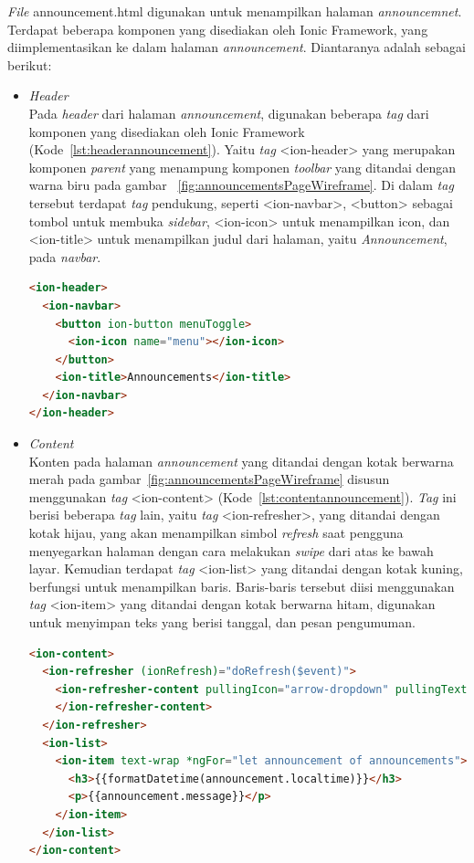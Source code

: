 \begin{itemize}
	\textit{File} announcement.html digunakan untuk menampilkan halaman \textit{announcemnet}. Terdapat beberapa komponen yang disediakan oleh Ionic Framework, yang diimplementasikan ke dalam halaman \textit{announcement}. Diantaranya adalah sebagai berikut:	
	
	\begin{itemize}
		\item \textit{Header} \\
		Pada \textit{header} dari halaman \textit{announcement}, digunakan beberapa \textit{tag} dari komponen yang disediakan oleh Ionic Framework (Kode~\ref{lst:headerannouncement}). Yaitu \textit{tag} <ion-header> yang merupakan komponen \textit{parent} yang menampung komponen \textit{toolbar} yang ditandai dengan warna biru pada gambar ~\ref{fig:announcementsPageWireframe}. Di dalam \textit{tag} tersebut terdapat \textit{tag} pendukung, seperti <ion-navbar>, <button> sebagai tombol untuk membuka \textit{sidebar}, <ion-icon> untuk menampilkan icon, dan <ion-title> untuk menampilkan judul dari halaman, yaitu \textit{Announcement}, pada \textit{navbar}.
		\newpage
\begin{lstlisting}[language=html, label={lst:headerannouncement}, caption=\textit{Header} pada halaman \textit{Annoncement}]
<ion-header>
  <ion-navbar>
    <button ion-button menuToggle>
      <ion-icon name="menu"></ion-icon>
    </button>
    <ion-title>Announcements</ion-title>
  </ion-navbar>
</ion-header>
\end{lstlisting} 

		\item \textit{Content} \\
		Konten pada halaman \textit{announcement} yang ditandai dengan kotak berwarna merah pada gambar~\ref{fig:announcementsPageWireframe} disusun menggunakan \textit{tag} <ion-content> (Kode~\ref{lst:contentannouncement}). \textit{Tag} ini berisi beberapa \textit{tag} lain, yaitu \textit{tag} <ion-refresher>, yang ditandai dengan kotak hijau, yang akan menampilkan simbol \textit{refresh} saat pengguna menyegarkan halaman dengan cara melakukan \textit{swipe} dari atas ke bawah layar. Kemudian terdapat \textit{tag} <ion-list> yang ditandai dengan kotak kuning, berfungsi untuk menampilkan baris. Baris-baris tersebut diisi menggunakan \textit{tag} <ion-item> yang ditandai dengan kotak berwarna hitam, digunakan untuk menyimpan teks yang berisi tanggal, dan pesan pengumuman.
		
\begin{lstlisting}[language=html, label={lst:contentannouncement}, caption=\textit{Content} pada halaman \textit{annoncement}]
<ion-content>
  <ion-refresher (ionRefresh)="doRefresh($event)">
    <ion-refresher-content pullingIcon="arrow-dropdown" pullingText="Pull to refresh" refreshingSpinner="circles" refreshingText="Refreshing...">
    </ion-refresher-content>
  </ion-refresher>
  <ion-list>
    <ion-item text-wrap *ngFor="let announcement of announcements">
      <h3>{{formatDatetime(announcement.localtime)}}</h3>
      <p>{{announcement.message}}</p>
    </ion-item>
  </ion-list>
</ion-content>
\end{lstlisting} 
	\end{itemize}
	

\end{itemize}

